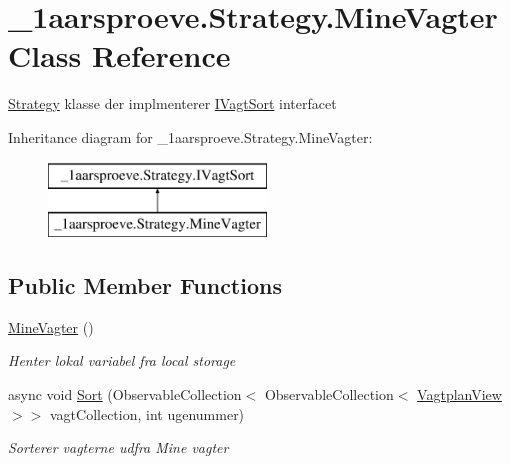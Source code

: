 \hypertarget{class__1aarsproeve_1_1_strategy_1_1_mine_vagter}{}\section{\+\_\+1aarsproeve.\+Strategy.\+Mine\+Vagter Class Reference}
\label{class__1aarsproeve_1_1_strategy_1_1_mine_vagter}


\hyperlink{namespace__1aarsproeve_1_1_strategy}{Strategy} klasse der implmenterer \hyperlink{interface__1aarsproeve_1_1_strategy_1_1_i_vagt_sort}{I\+Vagt\+Sort} interfacet  


Inheritance diagram for \+\_\+1aarsproeve.\+Strategy.\+Mine\+Vagter\+:\begin{figure}[H]
\begin{center}
\leavevmode
\includegraphics[height=2.000000cm]{class__1aarsproeve_1_1_strategy_1_1_mine_vagter}
\end{center}
\end{figure}
\subsection*{Public Member Functions}
\begin{DoxyCompactItemize}
\item 
\hyperlink{class__1aarsproeve_1_1_strategy_1_1_mine_vagter_a5fb954d9d27ccd9dfd74a35aeae4e104}{Mine\+Vagter} ()
\begin{DoxyCompactList}\small\item\em Henter lokal variabel fra local storage \end{DoxyCompactList}\item 
async void \hyperlink{class__1aarsproeve_1_1_strategy_1_1_mine_vagter_a08d7a660990e05e06a04d78e8f283f43}{Sort} (Observable\+Collection$<$ Observable\+Collection$<$ \hyperlink{class__1aarsproeve_1_1_model_1_1_vagtplan_view}{Vagtplan\+View} $>$$>$ vagt\+Collection, int ugenummer)
\begin{DoxyCompactList}\small\item\em Sorterer vagterne udfra Mine vagter \end{DoxyCompactList}\end{DoxyCompactItemize}
